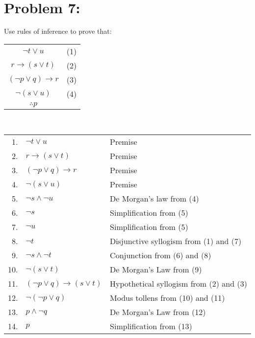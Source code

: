 \documentclass[12pt,en,a4paper]{report}
\begin{document}
	\section*{Problem 7:}
	Use rules of inference to prove that:\\
	\begin{table}[h]
		\centering
		\begin{tabular}{c l}
			$\neg t \vee u$ & (1)\\
			$r \rightarrow (s \vee t)$ & (2)\\
			$(\neg p \vee q) \rightarrow r$ & (3)\\
			$\neg (s \vee u)$ & (4)\\
			\hline
			$\therefore p$ & {}\\
		\end{tabular}
	\end{table}\\
	\begin{tabular}{r l l}
		1. & $\neg t \vee u$ & Premise\\
		2. & $r \rightarrow (s \vee t)$ & Premise\\
		3. & $(\neg p \vee q) \rightarrow r$ & Premise\\
		4. & $\neg (s \vee u)$ & Premise\\
		5. & $\neg s \wedge \neg u$ & De Morgan's law from (4)\\
		6. & $\neg s$ & Simplification from (5)\\
		7. & $\neg u$ & Simplification from (5)\\
		8. & $\neg t$ & Disjunctive syllogism from (1) and (7)\\
		9. & $\neg s \wedge \neg t$ & Conjunction from (6) and (8)\\
		10. & $\neg (s \vee t)$ & De Morgan's Law from (9)\\
		11. & $(\neg p \vee q) \rightarrow (s \vee t)$ & Hypothetical syllogism from (2) and (3)\\
		12. & $\neg (\neg p \vee q)$ & Modus tollens from (10) and (11)\\
		13. & $p \wedge \neg q$ & De Morgan's Law from (12)\\
		14. & $p$ & Simplification from (13)\\
	\end{tabular}
\newpage
{}
\end{document}
